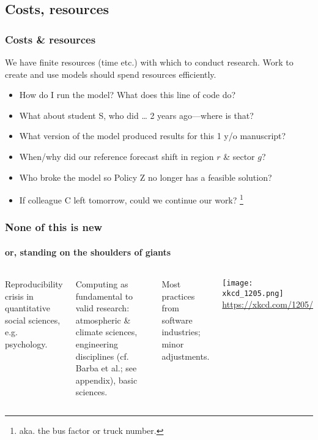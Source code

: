 \documentclass[12pt,aspectratio=169]{beamer}
\begin{document}
\subsection{Costs, resources}
\begin{frame}
\frametitle{Costs \& resources}

We have finite resources (time etc.) with which to conduct research.
Work to create and use models should spend resources efficiently.

\smallskip
{}
\begin{itemize}
  \item How do I run the model? What does this line of code do?
  \item What about student S, who did … 2 years ago—where is that?
  \item What version of the model produced results for this 1 y/o manuscript?
\end{itemize}

\begin{itemize}
  \item When/why did our reference forecast shift in region $r$ \& sector $g$?
  \item Who broke the model so Policy Z no longer has a feasible solution?
\end{itemize}

\begin{itemize}
  \item If colleague C left tomorrow, could we continue our work?%
  \footnote{aka. the bus factor or truck number.}
\end{itemize}

\end{frame}


\begin{frame}
\frametitle{None of this is new}
\framesubtitle{or, standing on the shoulders of giants}

\begin{columns}[T]
\column{0.45\paperwidth}
Reproducibility crisis in quantitative social sciences, e.g. psychology.

\bigskip
Computing as fundamental to valid research: atmospheric \& climate sciences, engineering disciplines (cf. Barba et al.; see appendix), basic sciences.

\bigskip
Most practices from software industries; minor adjustments.

\column{0.5\paperwidth}
\centering
\texttt{[image: xkcd\_1205.png]}
\url{https://xkcd.com/1205/}

\end{columns}

\end{frame}
\end{document}
